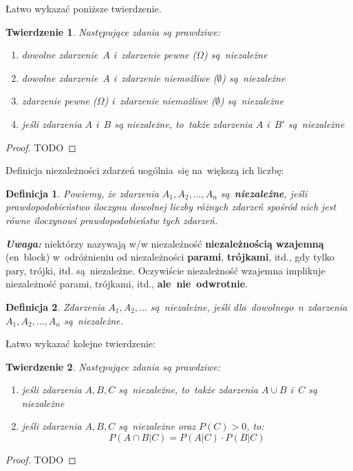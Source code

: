 \documentclass[10pt,a4paper]{article}
\newtheorem{definition}{Definicja}[section]
\newtheorem{theorem}{Twierdzenie}[section]
\newcommand{\Warning}{\marginpar{\dbend}\textbf{\textit{Uwaga: }}}
\numberwithin{equation}{subsection}
\begin{document}
Łatwo wykazać poniższe twierdzenie.
\begin{theorem}
  Następujące zdania są prawdziwe:
  \begin{enumerate}
    \item[1$^\circ$] dowolne zdarzenie~$A$ i~zdarzenie pewne ($\Omega$)
      są~niezależne
    \item[2$^\circ$] dowolne zdarzenie~$A$ i~zdarzenie niemożliwe ($\emptyset$)
      są~niezależne
    \item[3$^\circ$] zdarzenie pewne ($\Omega$) i~zdarzenie niemożliwe
      ($\emptyset$) są~niezależne
    \item[4$^\circ$] jeśli zdarzenia $A$ i~$B$ są niezależne, to~także zdarzenia
      $A$ i~$B'$ są~niezależne
  \end{enumerate}
\end{theorem}
\begin{proof}
  TODO
\end{proof}

Definicja niezależności zdarzeń uogólnia~się na~większą ich liczbę:
\begin{definition}
  Powiemy, że zdarzenia $A_1,A_2,...,A_n$ są~\textbf{niezależne}, jeśli
  prawdopodobieństwo iloczynu dowolnej liczby różnych zdarzeń spośród nich jest
  równe iloczynowi prawdopodobieństw tych zdarzeń.
\end{definition}

\Warning niektórzy nazywają w/w niezależność \textbf{niezależnością wzajemną}
(en~block) w~odróżnieniu od niezależności \textbf{parami}, \textbf{trójkami},
itd., gdy tylko pary, trójki, itd. są~niezależne. Oczywiście niezależność
wzajemna implikuje niezależność parami, trójkami, itd.,
\textbf{ale~nie~odwrotnie}.

\begin{definition}
  Zdarzenia $A_1,A_2,\dotsc$ są~niezależne, jeśli dla~dowolnego~$n$
  zdarzenia~$A_1,A_2,\dotsc,A_n$ są~niezależne.
\end{definition}

Łatwo wykazać kolejne twierdzenie:

\begin{theorem}
  Następujące zdania są prawdziwe:
  \begin{enumerate}
    \item jeśli zdarzenia $A,B,C$ są~niezależne, to~także zdarzenia $A\cup B$
      i~$C$ są niezależne
    \item jeśli zdarzenia $A,B,C$ są~niezależne oraz $P(C)>0$, to:
      \begin{equation}
        P(A\cap B|C)=P(A|C)\cdot P(B|C)
      \end{equation}
  \end{enumerate}
\end{theorem}
\begin{proof}
  TODO
\end{proof}
\end{document}
